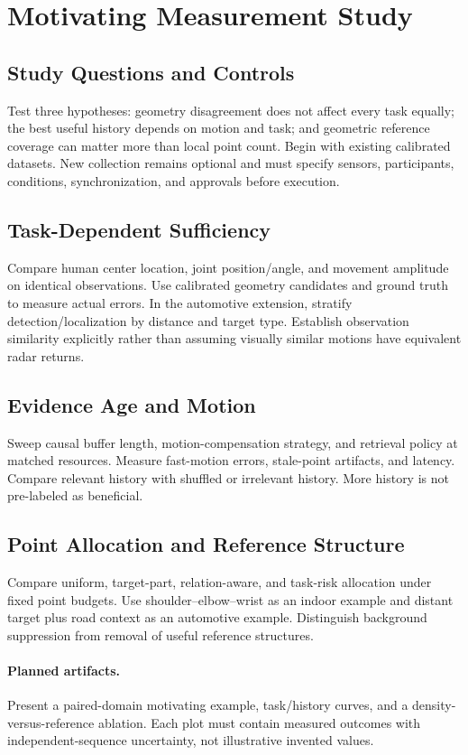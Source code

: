 \section{Motivating Measurement Study}
\label{sec:motivation}
\subsection{Study Questions and Controls}
Test three hypotheses: geometry disagreement does not affect every task equally; the best useful history depends on motion and task; and geometric reference coverage can matter more than local point count. Begin with existing calibrated datasets. New collection remains optional and must specify sensors, participants, conditions, synchronization, and approvals before execution.

\subsection{Task-Dependent Sufficiency}
Compare human center location, joint position/angle, and movement amplitude on identical observations. Use calibrated geometry candidates and ground truth to measure actual errors. In the automotive extension, stratify detection/localization by distance and target type. Establish observation similarity explicitly rather than assuming visually similar motions have equivalent radar returns.

\subsection{Evidence Age and Motion}
Sweep causal buffer length, motion-compensation strategy, and retrieval policy at matched resources. Measure fast-motion errors, stale-point artifacts, and latency. Compare relevant history with shuffled or irrelevant history. More history is not pre-labeled as beneficial.

\subsection{Point Allocation and Reference Structure}
Compare uniform, target-part, relation-aware, and task-risk allocation under fixed point budgets. Use shoulder--elbow--wrist as an indoor example and distant target plus road context as an automotive example. Distinguish background suppression from removal of useful reference structures.

\paragraph{Planned artifacts.}
Present a paired-domain motivating example, task/history curves, and a density-versus-reference ablation. Each plot must contain measured outcomes with independent-sequence uncertainty, not illustrative invented values.
